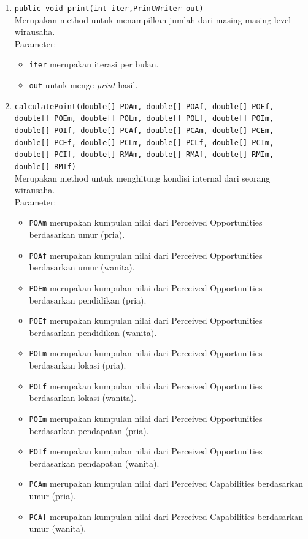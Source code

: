 \begin{enumerate}
			\item \texttt{public void print(int iter,PrintWriter out)}\\
			Merupakan method untuk menampilkan jumlah dari masing-masing level wirausaha.\\
			Parameter:
			\begin{itemize}
				\item \texttt{iter} merupakan iterasi per bulan.
				\item \texttt{out} untuk menge-\textit{print} hasil.
			\end{itemize}
			
			\item \texttt{calculatePoint(double[] POAm, double[] POAf, double[] POEf, double[] POEm, double[] POLm, double[] POLf, double[] POIm, double[] POIf, double[] PCAf, double[] PCAm, double[] PCEm, double[] PCEf, double[] PCLm, double[] PCLf, double[] PCIm, double[] PCIf, double[] RMAm, double[] RMAf, double[] RMIm, double[] RMIf)}\\
			Merupakan method untuk menghitung kondisi internal dari seorang wirausaha.\\
			Parameter:
			\begin{itemize}
				\item \texttt{POAm} merupakan kumpulan nilai dari Perceived Opportunities berdasarkan umur (pria).
				\item \texttt{POAf} merupakan kumpulan nilai dari Perceived Opportunities berdasarkan umur (wanita).
				\item \texttt{POEm} merupakan kumpulan nilai dari Perceived Opportunities berdasarkan pendidikan (pria).
				\item \texttt{POEf} merupakan kumpulan nilai dari Perceived Opportunities berdasarkan pendidikan (wanita).
				\item \texttt{POLm} merupakan kumpulan nilai dari Perceived Opportunities berdasarkan lokasi (pria).
				\item \texttt{POLf} merupakan kumpulan nilai dari Perceived Opportunities berdasarkan lokasi (wanita).
				\item \texttt{POIm} merupakan kumpulan nilai dari Perceived Opportunities berdasarkan pendapatan (pria).
				\item \texttt{POIf} merupakan kumpulan nilai dari Perceived Opportunities berdasarkan pendapatan (wanita).
				\item \texttt{PCAm} merupakan kumpulan nilai dari Perceived Capabilities berdasarkan umur (pria).
				\item \texttt{PCAf} merupakan kumpulan nilai dari Perceived Capabilities berdasarkan umur (wanita).

\end{itemize}
\end{enumerate}
